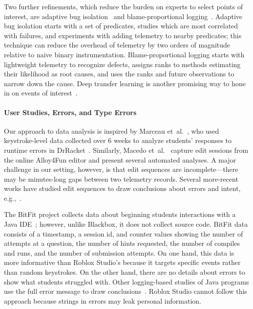 \documentclass[english,submission,cleveref]{programming}
\begin{document}
Two further refinements, which reduce the burden on experts to
select points of interest, are adaptive bug isolation~\cite{nl-icse-2010}
and blame-proportional logging~\cite{lnsmc-usenix-2018}.
Adaptive bug isolation starts with a set of predicates, studies which are
most correlated with failures, and experiments with adding telemetry to nearby
predicates; this technique can reduce the overhead of telemetry by two orders
of magnitude relative to naive binary instrumentation.
Blame-proportional logging starts with lightweight telemetry to recognize
defects, assigns ranks to methods estimating their likelihood as root causes,
and uses the ranks and future observations to narrow down the cause.
Deep transfer learning is another promising way to hone in on events of
interest~\cite{zfstt-ieeesensors-2022}.




\paragraph{User Studies, Errors, and Type Errors}

Our approach to data analysis is inspired by Marceau
et~al.~\cite{mfk-onward-2011,mfk-sigcse-2011}, who used keystroke-level data
collected over 6 weeks to analyze students' responses to runtime errors
in DrRacket~\cite{fcffksf-jfp-2002}.
Similarly, Macedo et~al.~\cite{mcpcsprs-abz-2020,mcpcsprs-scp-2021} capture
edit sessions from the online Alloy4Fun editor and present several automated
analyses.
A major challenge in our setting, however, is that edit sequences are
incomplete---there may be minutes-long gaps between two telemetry records.
Several more-recent works have studied edit sequences
to draw conclusions about errors and intent, e.g.,~\cite{wk-koli-2020,lgk-pj-2022,rsgl-cpp-2020}.

The BitFit project collects data about beginning students interactions with a
Java IDE~\cite{ekc-wccce-2016,anna-russo-kennedy-ms-2006}; however, unlike Blackbox, it does
not collect source code.
BitFit data consists of a timestamp, a session id, and counter values showing
the number of attempts at a question, the number of hints requested, the number
of compiles and runs, and the number of submission attempts.
On one hand, this data is more informative than Roblox Studio's because it
targets specific events rather than random keystrokes.
On the other hand, there are no details about errors to show what students
struggled with.
Other logging-based studies of Java programs use the full error message to
draw conclusions~\cite{bgimgm-cse-2016,dlc-iticse-2014}.
Roblox Studio cannot follow this approach because strings in errors may leak
personal information.
\end{document}
